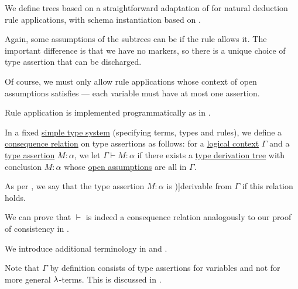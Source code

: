 \begin{definition}
\begin{thmenum}[resume=def:type_derivation_tree]
     We define  trees based on a straightforward adaptation of  for natural deduction rule applications, with schema instantiation based on .

    Again, some assumptions of the subtrees can be  if the rule allows it. The important difference is that we have no markers, so there is a unique choice of type assertion that can be discharged.

    Of course, we must only allow rule applications whose context of open assumptions satisfies  --- each variable must have at most one assertion.
  \end{thmenum}
\end{definition}
\begin{comments}
  \item Rule application is implemented programmatically as  in \cite{notebook:code}.
\end{comments}

\begin{definition}\label{def:simple_type_derivability}\mimprovised
  In a fixed \hyperref[def:simple_type_system]{simple type system} (specifying terms, types and rules), we define a \hyperref[def:consequence_relation]{consequence relation} on type assertions as follows: for a \hyperref[def:logical_context]{logical context} \( \Gamma \) and a \hyperref[def:type_assertion]{type assertion} \( M: \alpha \), we let \( \Gamma \vdash M: \alpha \) if there exists a \hyperref[def:type_derivation_tree]{type derivation tree} with conclusion \( M: \alpha \) whose \hyperref[def:natural_deduction_proof_tree/context]{open assumptions} are all in \( \Gamma \).

  As per , we say that the type assertion \( M: \alpha \) is \term[en=derivable (\cite[def. 3.1.4]{Barendregt1992Types})]{derivable} from \( \Gamma \) if this relation holds.
\end{definition}
\begin{defproof}
  We can prove that \( {\vdash} \) is indeed a consequence relation analogously to our proof of consistency in .
\end{defproof}
\begin{comments}
  \item We introduce additional terminology in  and .

  \item Note that \( \Gamma \) by definition consists of type assertions for variables and not for more general \( \mathrm{\lambda} \)-terms. This is discussed in .
\end{comments}

